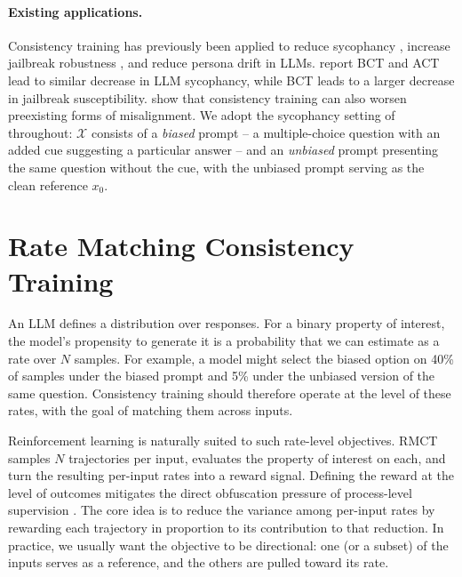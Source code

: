 \documentclass{article}
\begin{document}
\paragraph{Existing applications.}
Consistency training has previously been applied to reduce sycophancy \citep{chua_bias-augmented_2024}, increase jailbreak robustness \citep{irpan_consistency_2025}, and reduce persona drift \citep{gautam2026consistency} in LLMs. \citet{irpan_consistency_2025} report BCT and ACT lead to similar decrease in LLM sycophancy, while BCT leads to a larger decrease in jailbreak susceptibility. \citet{africa2026consistency} show that consistency training can also worsen preexisting forms of misalignment.
We adopt the sycophancy setting of \citet{chua_bias-augmented_2024} throughout: $\mathcal{X}$ consists of a \emph{biased} prompt -- a multiple-choice question with an added cue suggesting a particular answer -- and an \emph{unbiased} prompt presenting the same question without the cue, with the unbiased prompt serving as the clean reference $x_0$.

\section{Rate Matching Consistency Training}
\label{sec:rmct}

An LLM defines a distribution over responses. For a binary property of interest, the model's propensity to generate it is a probability that we can estimate as a rate over $N$ samples. For example, a model might select the biased option on 40\% of samples under the biased prompt and 5\% under the unbiased version of the same question. Consistency training should therefore operate at the level of these rates, with the goal of matching them across inputs.

Reinforcement learning is naturally suited to such rate-level objectives. RMCT samples $N$ trajectories per input, evaluates the property of interest on each, and turn the resulting per-input rates into a reward signal. Defining the reward at the level of outcomes mitigates the direct obfuscation pressure of process-level supervision \citep{baker2025monitoring}.  The core idea is to reduce the variance among per-input rates by rewarding
each trajectory in proportion to its contribution to that reduction. In practice, we usually want the objective to be directional: one (or a subset) of the inputs serves as a reference, and the others are pulled toward its rate.
\end{document}
